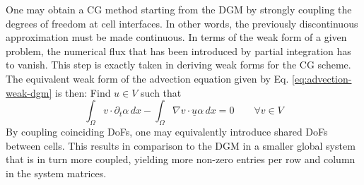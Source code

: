 \documentclass[asi,article,submit,moreauthors]{Definitions/mdpi}
\begin{document}
One may obtain a CG method starting from the DGM by strongly coupling the degrees of freedom at cell interfaces. In other words, the previously discontinuous approximation must be made continuous.
In terms of the weak form of a given problem, the numerical flux that has been introduced by partial integration has to vanish.
This step is exactly taken in deriving weak forms for the CG scheme.
The equivalent weak form of the advection equation given by Eq. \ref{eq:advection-weak-dgm} is then: Find $u \in V$ such that
\begin{equation}\label{eq:advection-weak-cgm}
    \int_\Omega v \cdot \partial_t \alpha \,dx - \int_\Omega \nabla v \cdot \underline{u} \alpha \,dx = 0 \qquad \forall v \in V
\end{equation}
By coupling coinciding DoFs, one may equivalently introduce shared DoFs between cells.
This results in comparison to the DGM in a smaller global system that is in turn more coupled, yielding more non-zero entries per row and column in the system matrices.
\end{document}
